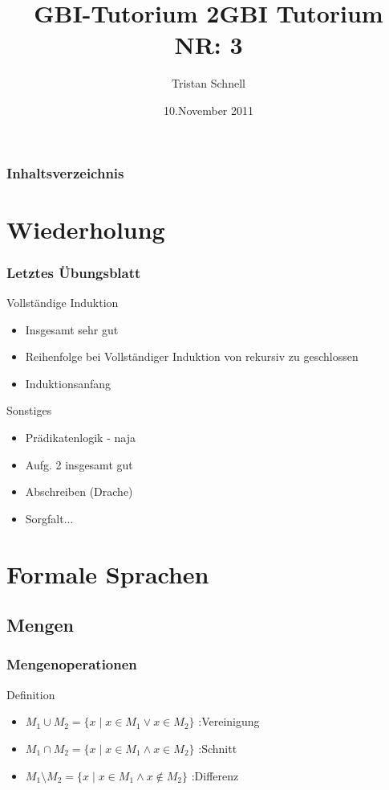 \documentclass{beamer}
\author{Tristan Schnell}
\title{GBI-Tutorium 2}
\date{10.November 2011}
\title {GBI Tutorium NR: 3}
\begin{document}
\begin {frame}
	\titlepage
\end {frame}

\begin {frame}
	\frametitle {Inhaltsverzeichnis}
	\tableofcontents
\end {frame}

\section{Wiederholung}

\begin{frame}
	\frametitle{Letztes Übungsblatt}
		\begin{block}{Vollständige Induktion}
			\begin{itemize}
				\item Insgesamt sehr gut
				\item Reihenfolge bei Vollständiger Induktion von rekursiv zu geschlossen
				\item Induktionsanfang
			\end{itemize}
		\end{block}
		\begin{block}{Sonstiges}
			\begin{itemize}
				\item Prädikatenlogik - naja
				\item Aufg. 2 insgesamt gut
				\item Abschreiben (Drache)
				\item Sorgfalt...
			\end{itemize}
		\end{block}
\end{frame}

\section{Formale Sprachen}
\subsection[Mengen]{Mengen}
\begin{frame}
	\frametitle{Mengenoperationen}
	\begin{block}{Definition}
		\begin{itemize}
			\item $ M_1 \cup M_2 = \{x \mid x \in M_1 \lor x \in M_2\} $  :Vereinigung
			\item $ M_1 \cap M_2 = \{ x \mid x \in M_1 \land x \in M_2 \} $  :Schnitt
			\item $ M_1 \setminus M_2 = \{x \mid x \in M_1 \land x \notin M_2 \}$ :Differenz
		\end{itemize}
	\end{block}	
\end{frame}
\end{document}
